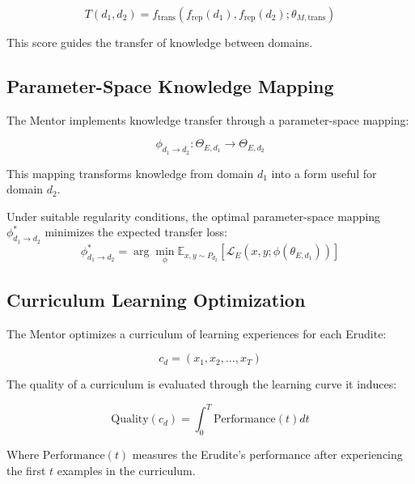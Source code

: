 \begin{equation}
T(d_1, d_2) = f_{\text{trans}}(f_{\text{rep}}(d_1), f_{\text{rep}}(d_2); \theta_{M,\text{trans}})
\end{equation}

This score guides the transfer of knowledge between domains.

\subsection{Parameter-Space Knowledge Mapping}

The Mentor implements knowledge transfer through a parameter-space mapping:

\begin{equation}
\phi_{d_1 \rightarrow d_2} : \Theta_{E,d_1} \rightarrow \Theta_{E,d_2}
\end{equation}

This mapping transforms knowledge from domain $d_1$ into a form useful for domain $d_2$.

\begin{theorem}
Under suitable regularity conditions, the optimal parameter-space mapping $\phi_{d_1 \rightarrow d_2}^*$ minimizes the expected transfer loss:
\begin{equation}
\phi_{d_1 \rightarrow d_2}^* = \arg\min_{\phi} \mathbb{E}_{x,y \sim P_{d_2}} [\mathcal{L}_E(x, y; \phi(\theta_{E,d_1}))]
\end{equation}
\end{theorem}

\subsection{Curriculum Learning Optimization}

The Mentor optimizes a curriculum of learning experiences for each Erudite:

\begin{equation}
c_d = (x_1, x_2, \ldots, x_T)
\end{equation}

The quality of a curriculum is evaluated through the learning curve it induces:

\begin{equation}
\text{Quality}(c_d) = \int_{0}^{T} \text{Performance}(t) dt
\end{equation}

Where $\text{Performance}(t)$ measures the Erudite's performance after experiencing the first $t$ examples in the curriculum.


